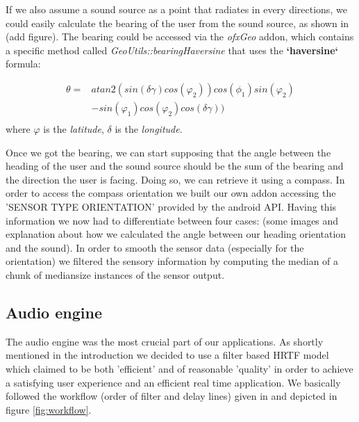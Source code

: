 \documentclass[journal]{IEEEtran}
\begin{document}
If we also assume a sound source as a point that radiates in every directions, we could easily calculate the bearing of the user from the sound source, as shown in (add figure). The bearing could be accessed via the \emph{ofxGeo} addon, which contains a specific method called \emph{GeoUtils::bearingHaversine} that uses the \textbf{`haversine`} formula:

\begin{equation*}\label{eq:haversine}
\begin{split}
	\theta = & atan2(sin (\delta \gamma)cos(\varphi_2)) cos(\phi_1)sin(\varphi_2)\\
	&-sin(\varphi_1)cos(\varphi_2)cos(\delta \gamma)) \\
\end{split}
\end{equation*}
where $\varphi$ is the \emph{latitude}, $\delta$ is the \emph{longitude}.

Once we got the bearing, we can start supposing that the angle between the heading of the user and the sound source should be the sum of the bearing and the direction the user is facing. Doing so, we can retrieve it using a compass. In order to access the compass orientation we built our own addon accessing the 'SENSOR TYPE ORIENTATION' provided by the android API. Having this information we now had to differentiate between four cases: (some images and explanation about how we calculated the angle between our heading orientation and the sound). In order to smooth the sensor data (especially for the orientation) we filtered the sensory information by computing the median of a chunk of mediansize instances of the sensor output. 

\subsection{Audio engine}
The audio engine was the most crucial part of our applications. As shortly mentioned in the introduction we decided to use a filter based HRTF model which claimed to be both 'efficient' and of reasonable 'quality' \cite{Brown1997} in order to achieve a satisfying user experience and an efficient real time application. We basically followed the workflow (order of filter and delay lines) given in \cite{Brown1997} and depicted in figure \ref{fig:workflow}. 
\end{document}
